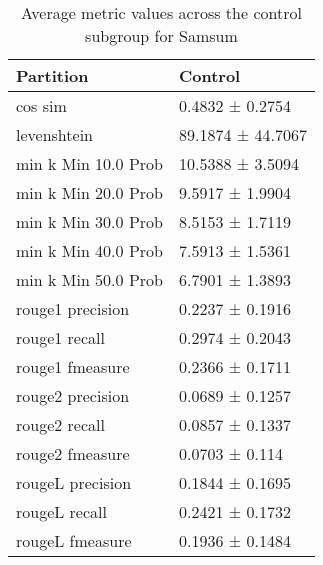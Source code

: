 \begin{table}
\caption{Average metric values across the control subgroup for Samsum}
\label{tab:}
\begin{tabular}{ll}
\toprule
Partition & Control \\
\midrule
cos sim & 0.4832 ± 0.2754 \\
levenshtein & 89.1874 ± 44.7067 \\
min k Min 10.0 Prob & 10.5388 ± 3.5094 \\
min k Min 20.0 Prob & 9.5917 ± 1.9904 \\
min k Min 30.0 Prob & 8.5153 ± 1.7119 \\
min k Min 40.0 Prob & 7.5913 ± 1.5361 \\
min k Min 50.0 Prob & 6.7901 ± 1.3893 \\
rouge1 precision & 0.2237 ± 0.1916 \\
rouge1 recall & 0.2974 ± 0.2043 \\
rouge1 fmeasure & 0.2366 ± 0.1711 \\
rouge2 precision & 0.0689 ± 0.1257 \\
rouge2 recall & 0.0857 ± 0.1337 \\
rouge2 fmeasure & 0.0703 ± 0.114 \\
rougeL precision & 0.1844 ± 0.1695 \\
rougeL recall & 0.2421 ± 0.1732 \\
rougeL fmeasure & 0.1936 ± 0.1484 \\
\bottomrule
\end{tabular}
\end{table}
